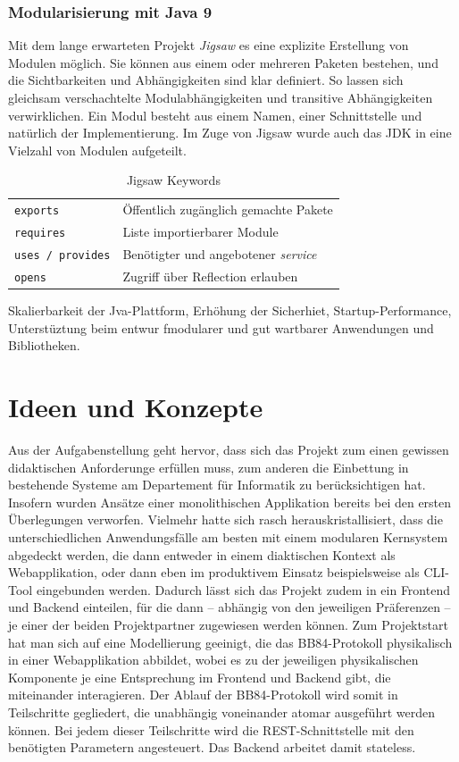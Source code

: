 \documentclass[a4paper,10.2pt,pdftex]{scrartcl}%
\begin{document}
\subsubsection{Modularisierung mit Java 9} 
Mit dem lange erwarteten Projekt \emph{Jigsaw} es eine explizite Erstellung von Modulen möglich. Sie können aus einem oder mehreren Paketen bestehen, und die Sichtbarkeiten und Abhängigkeiten sind klar definiert. So lassen sich gleichsam verschachtelte Modulabhängigkeiten und transitive Abhängigkeiten verwirklichen. Ein Modul besteht aus einem Namen, einer Schnittstelle und natürlich der Implementierung. Im Zuge von Jigsaw wurde auch das JDK in eine Vielzahl von Modulen aufgeteilt\cite[S. 863]{inden}. 

\begin{table}
\hspace{1cm}
\begin{tabular}{ll}
\texttt{exports} & Öffentlich zugänglich gemachte Pakete \\
\texttt{requires} & Liste importierbarer Module \\
\texttt{uses / provides} & Benötigter und angebotener \emph{service} \\
\texttt{opens} & Zugriff über Reflection erlauben
\end{tabular} 
\caption{Jigsaw Keywords}
\end{table}

Skalierbarkeit der Jva-Plattform, Erhöhung der Sicherhiet, Startup-Performance, Unterstüztung beim entwur fmodularer und gut wartbarer Anwendungen und Bibliotheken. 



\section{Ideen und Konzepte}
Aus der Aufgabenstellung geht hervor, dass sich das Projekt zum einen gewissen didaktischen Anforderunge erfüllen muss, zum anderen die Einbettung in bestehende Systeme am Departement für Informatik zu berücksichtigen hat. Insofern wurden Ansätze einer monolithischen Applikation bereits bei den ersten Überlegungen verworfen. Vielmehr hatte sich rasch herauskristallisiert, dass die unterschiedlichen Anwendungsfälle am besten mit einem modularen Kernsystem abgedeckt werden, die dann entweder in einem diaktischen Kontext als Webapplikation, oder dann eben im produktivem Einsatz beispielsweise als CLI-Tool eingebunden werden. Dadurch lässt sich das Projekt zudem in ein Frontend und Backend einteilen, für die dann -- abhängig von den jeweiligen Präferenzen --  je einer der beiden Projektpartner zugewiesen werden können. Zum Projektstart hat man sich auf eine Modellierung geeinigt, die das BB84-Protokoll physikalisch in einer Webapplikation abbildet, wobei es zu der jeweiligen physikalischen Komponente je eine Entsprechung im Frontend und Backend gibt, die miteinander interagieren. Der Ablauf der BB84-Protokoll wird somit in Teilschritte gegliedert, die unabhängig voneinander atomar ausgeführt werden können. Bei jedem dieser Teilschritte wird die REST-Schnittstelle mit den benötigten Parametern angesteuert. Das Backend arbeitet damit stateless. 
\end{document}
